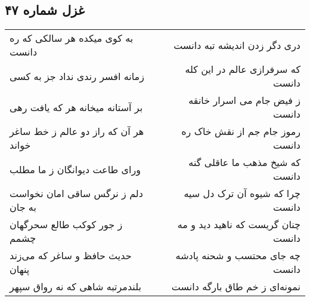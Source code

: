 \begin{center}
\section*{غزل شماره ۴۷}
\label{sec:sh047}
\begin{longtable}{l p{0.5cm} r}
به کوی میکده هر سالکی که ره دانست
&&
دری دگر زدن اندیشه تبه دانست
\\
زمانه افسر رندی نداد جز به کسی
&&
که سرفرازی عالم در این کله دانست
\\
بر آستانه میخانه هر که یافت رهی
&&
ز فیض جام می اسرار خانقه دانست
\\
هر آن که راز دو عالم ز خط ساغر خواند
&&
رموز جام جم از نقش خاک ره دانست
\\
ورای طاعت دیوانگان ز ما مطلب
&&
که شیخ مذهب ما عاقلی گنه دانست
\\
دلم ز نرگس ساقی امان نخواست به جان
&&
چرا که شیوه آن ترک دل سیه دانست
\\
ز جور کوکب طالع سحرگهان چشمم
&&
چنان گریست که ناهید دید و مه دانست
\\
حدیث حافظ و ساغر که می‌زند پنهان
&&
چه جای محتسب و شحنه پادشه دانست
\\
بلندمرتبه شاهی که نه رواق سپهر
&&
نمونه‌ای ز خم طاق بارگه دانست
\\
\end{longtable}
\end{center}
